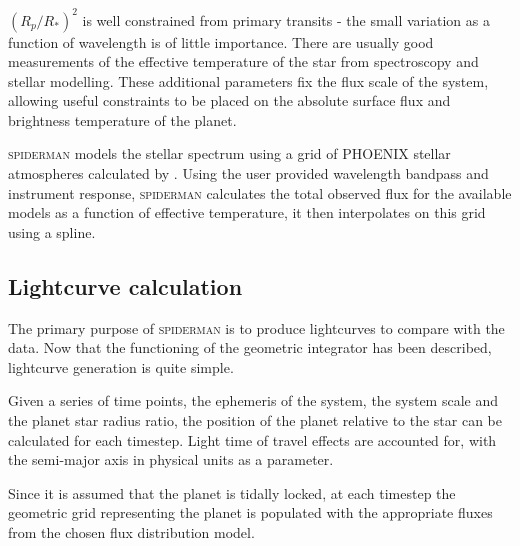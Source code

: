 \documentclass[a4paper,fleqn,usenatbib]{mnras}
\begin{document}

$(R_p / R_*)^2$ is well constrained from primary transits - the small variation as a function of wavelength is of little importance. There are usually good measurements of the effective temperature of the star from spectroscopy and stellar modelling. These additional parameters fix the flux scale of the system, allowing useful constraints to be placed on the absolute surface flux and brightness temperature of the planet.

\textsc{spiderman} models the stellar spectrum using a grid of PHOENIX stellar atmospheres calculated by \citet{Husser2013}. Using the user provided wavelength bandpass and instrument response, \textsc{spiderman} calculates the total observed flux for the available models as a function of effective temperature, it then interpolates on this grid using a spline.

\subsection{Lightcurve calculation}\label{sec:lightcurve}

The primary purpose of \textsc{spiderman} is to produce lightcurves to compare with the data. Now that the functioning of the geometric integrator has been described, lightcurve generation is quite simple.

Given a series of time points, the ephemeris of the system, the system scale and the planet star radius ratio, the position of the planet relative to the star can be calculated for each timestep. Light time of travel effects are accounted for, with the semi-major axis in physical units as a parameter.

Since it is assumed that the planet is tidally locked, at each timestep the geometric grid representing the planet is populated with the appropriate fluxes from the chosen flux distribution model.
\end{document}
